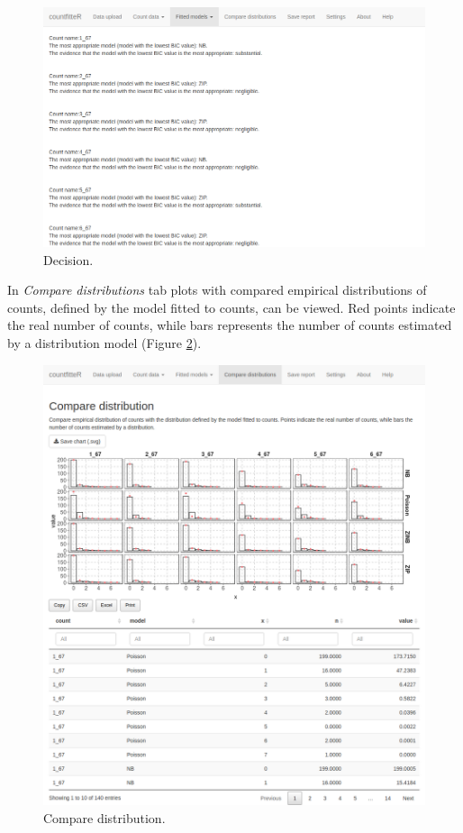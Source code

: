 \begin{figure}[htbp]
  \centering
  \includegraphics[width=0.99\columnwidth]{fig/cf_fm3.png}
  \caption{Decision.}
    \label{cf_fm3}
\end{figure}

In \textit{Compare distributions} tab plots with compared empirical distributions of counts, defined by the model fitted to counts, can be viewed. Red points indicate the real number of counts, while bars represents the number of counts estimated by a distribution model (Figure \ref{cf_cmp}).

\begin{figure}[htbp]
  \centering
  \includegraphics[width=0.99\columnwidth]{fig/cf_cmp.png}
  \caption{Compare distribution.}
    \label{cf_cmp}
\end{figure}

